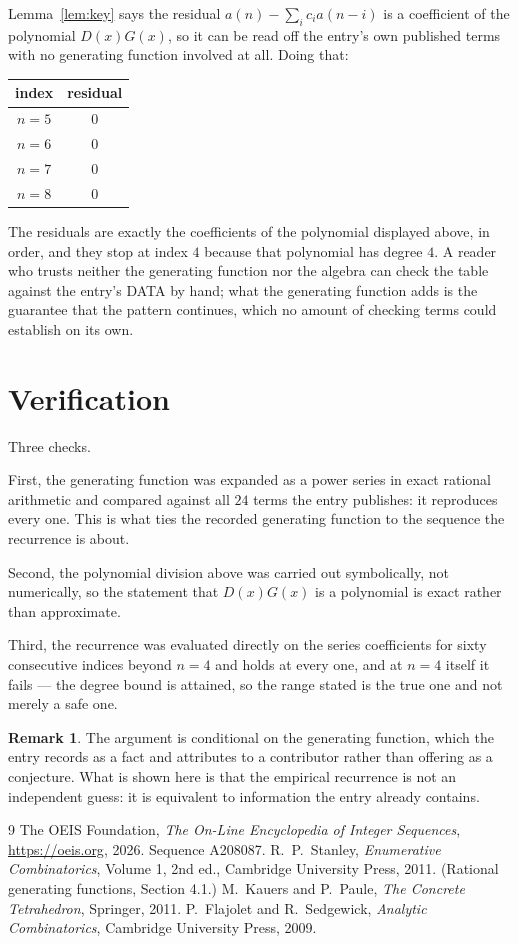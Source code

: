 \documentclass[11pt,a4paper]{article}
\theoremstyle{plain}
\theoremstyle{definition}
\newtheorem{remark}[theorem]{Remark}
\begin{document}
Lemma~\ref{lem:key} says the residual $a(n)-\sum_ic_ia(n-i)$ is a coefficient of the
polynomial $D(x)G(x)$, so it can be read off the entry's own published terms with no
generating function involved at all. Doing that:
\begin{center}
\begin{tabular}{cc}
index & residual \\ \hline
$n=5$ & $0$ \\
$n=6$ & $0$ \\
$n=7$ & $0$ \\
$n=8$ & $0$
\end{tabular}
\end{center}
The residuals are exactly the coefficients of the polynomial displayed above, in order, and
they stop at index $4$ because that polynomial has degree $4$. A reader who trusts
neither the generating function nor the algebra can check the table against the entry's DATA
by hand; what the generating function adds is the guarantee that the pattern continues, which
no amount of checking terms could establish on its own.

\section{Verification}

Three checks.

First, the generating function was expanded as a power series in exact rational arithmetic and
compared against all $24$ terms the entry publishes: it reproduces every one. This is
what ties the recorded generating function to the sequence the recurrence is about.

Second, the polynomial division above was carried out symbolically, not numerically, so the
statement that $D(x)G(x)$ is a polynomial is exact rather than approximate.

Third, the recurrence was evaluated directly on the series coefficients for sixty consecutive
indices beyond $n=4$ and holds at every one, and at $n=4$ itself it fails --- the
degree bound is attained, so the range stated is the true one and not merely a safe one.

\begin{remark}
The argument is conditional on the generating function, which the entry records as a fact and
attributes to a contributor rather than offering as a conjecture. What is shown here is that
the empirical recurrence is not an independent guess: it is equivalent to information the
entry already contains.
\end{remark}

\begin{thebibliography}{9}
 The OEIS Foundation, \emph{The On-Line Encyclopedia of Integer
Sequences}, \url{https://oeis.org}, 2026. Sequence A208087.
 R.~P.~Stanley, \emph{Enumerative Combinatorics}, Volume 1, 2nd ed.,
Cambridge University Press, 2011. (Rational generating functions, Section 4.1.)
 M.~Kauers and P.~Paule, \emph{The Concrete Tetrahedron}, Springer, 2011.
 P.~Flajolet and R.~Sedgewick, \emph{Analytic Combinatorics}, Cambridge
University Press, 2009.
\end{thebibliography}
\end{document}
